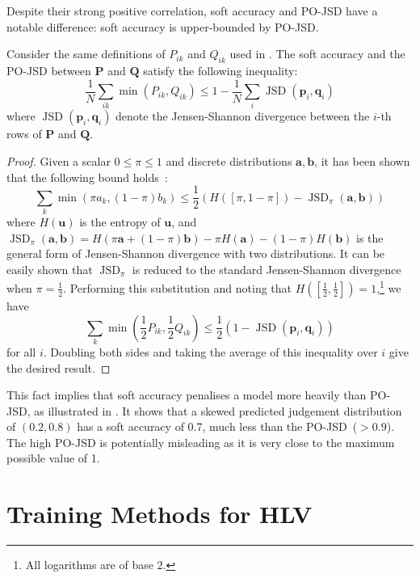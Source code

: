 \documentclass[shortpaper]{clv2025}
\newcommand{\pojsd}{PO-JSD\xspace}
\DeclareMathOperator{\JSD}{JSD}
\begin{document}
Despite their strong positive correlation, soft accuracy and \pojsd have a
notable difference: soft accuracy is upper-bounded by \pojsd.
\begin{theorem}
  Consider the same definitions of $P_{ik}$ and $Q_{ik}$ used in .
  The soft accuracy and the \pojsd between $\mathbf{P}$ and $\mathbf{Q}$
  satisfy the following inequality:
  \begin{equation*}
    \frac{1}{N}\sum_{ik}\min(P_{ik},Q_{ik})\leq1-\frac{1}{N}\sum_{i}\JSD(\mathbf{p}_i,\mathbf{q}_i)
  \end{equation*}
  where $\JSD(\mathbf{p}_i,\mathbf{q}_i)$ denote the Jensen-Shannon
  divergence between the $i$-th rows of $\mathbf{P}$ and $\mathbf{Q}$.
\end{theorem}

\begin{proof}
  Given a scalar $0\leq\pi\leq1$ and discrete distributions
  $\mathbf{a},\mathbf{b}$, it has been shown that the following bound
  holds~\citep[Theorem 4]{lin1991}:
  \begin{equation*}
    \sum_k\min(\pi a_k,(1-\pi)b_k)
    \leq\frac{1}{2}\left(H([\pi,1-\pi])-\JSD_\pi(\mathbf{a},\mathbf{b})\right)
  \end{equation*}
  where $H(\mathbf{u})$ is the entropy of $\mathbf{u}$, and
  $\JSD_\pi(\mathbf{a},\mathbf{b})=H(\pi\mathbf{a}+(1-\pi)\mathbf{b})-\pi
  H(\mathbf{a})-(1-\pi)H(\mathbf{b})$ is the general form of Jensen-Shannon
  divergence with two distributions. It can be easily shown that
  $\JSD_\pi$ is reduced to the standard Jensen-Shannon divergence when
  $\pi=\frac{1}{2}$. Performing this substitution and noting that
  $H([\frac{1}{2},\frac{1}{2}])=1$,\footnote{All logarithms are of base 2.} we
  have
  \begin{equation*}
    \sum_k\min(\frac{1}{2}P_{ik},\frac{1}{2}Q_{ik})\leq\frac{1}{2}\left(1-\JSD(\mathbf{p}_i,\mathbf{q}_i)\right)
  \end{equation*}
  for all $i$. Doubling both sides and taking the average of this inequality
  over $i$ give the desired result.
\end{proof}
This fact implies that soft accuracy penalises a model more heavily than \pojsd,
as illustrated in . It shows that a skewed predicted
judgement distribution of $(0.2,0.8)$ has a soft accuracy of \num{0.7}, much
less than the \pojsd~($> 0.9$). The high \pojsd is potentially misleading as it
is very close to the maximum possible value of 1.

\section{Training Methods for HLV}
\end{document}
